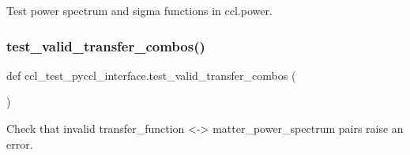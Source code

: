 \begin{DoxyVerb}Test power spectrum and sigma functions in ccl.power.
\end{DoxyVerb}
 \mbox{\label{namespaceccl__test__pyccl__interface_a64e29dd68981ffe884100ab216146869}} 
\subsubsection{\texorpdfstring{test\+\_\+valid\+\_\+transfer\+\_\+combos()}{test\_valid\_transfer\_combos()}}
{\footnotesize\ttfamily def ccl\+\_\+test\+\_\+pyccl\+\_\+interface.\+test\+\_\+valid\+\_\+transfer\+\_\+combos (\begin{DoxyParamCaption}{ }\end{DoxyParamCaption})}

\begin{DoxyVerb}Check that invalid transfer_function <-> matter_power_spectrum pairs raise
an error.
\end{DoxyVerb}
 